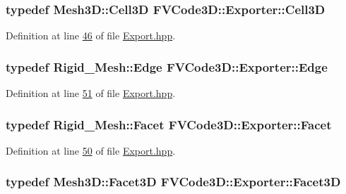 \subsubsection[{\texorpdfstring{Cell3D}{Cell3D}}]{\setlength{\rightskip}{0pt plus 5cm}typedef {\bf Mesh3\+D\+::\+Cell3D} {\bf F\+V\+Code3\+D\+::\+Exporter\+::\+Cell3D}}\hypertarget{classFVCode3D_1_1Exporter_a3f305f09b65232ef0d2673269f2144a1}{}\label{classFVCode3D_1_1Exporter_a3f305f09b65232ef0d2673269f2144a1}


Definition at line \hyperlink{Export_8hpp_source_l00046}{46} of file \hyperlink{Export_8hpp_source}{Export.\+hpp}.

\subsubsection[{\texorpdfstring{Edge}{Edge}}]{\setlength{\rightskip}{0pt plus 5cm}typedef {\bf Rigid\+\_\+\+Mesh\+::\+Edge} {\bf F\+V\+Code3\+D\+::\+Exporter\+::\+Edge}}\hypertarget{classFVCode3D_1_1Exporter_a354e98139cc766ef0da8ffd5b2196f5b}{}\label{classFVCode3D_1_1Exporter_a354e98139cc766ef0da8ffd5b2196f5b}


Definition at line \hyperlink{Export_8hpp_source_l00051}{51} of file \hyperlink{Export_8hpp_source}{Export.\+hpp}.

\subsubsection[{\texorpdfstring{Facet}{Facet}}]{\setlength{\rightskip}{0pt plus 5cm}typedef {\bf Rigid\+\_\+\+Mesh\+::\+Facet} {\bf F\+V\+Code3\+D\+::\+Exporter\+::\+Facet}}\hypertarget{classFVCode3D_1_1Exporter_a759e8978d901cd0901471438ec73a778}{}\label{classFVCode3D_1_1Exporter_a759e8978d901cd0901471438ec73a778}


Definition at line \hyperlink{Export_8hpp_source_l00050}{50} of file \hyperlink{Export_8hpp_source}{Export.\+hpp}.

\subsubsection[{\texorpdfstring{Facet3D}{Facet3D}}]{\setlength{\rightskip}{0pt plus 5cm}typedef {\bf Mesh3\+D\+::\+Facet3D} {\bf F\+V\+Code3\+D\+::\+Exporter\+::\+Facet3D}}\hypertarget{classFVCode3D_1_1Exporter_ad902e2a70d9756f7698c47c3be815df0}{}\label{classFVCode3D_1_1Exporter_ad902e2a70d9756f7698c47c3be815df0}



